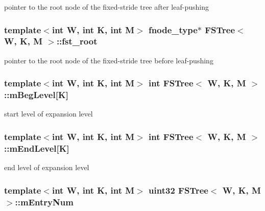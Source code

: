 pointer to the root node of the fixed-\/stride tree after leaf-\/pushing 

\hypertarget{classFSTree_ae2f006ad7037ccce518c2e21cebde7f1}{
\subsubsection[{fst\-\_\-root}]{\setlength{\rightskip}{0pt plus 5cm}template$<$int W, int K, int M$>$ {\bf fnode\-\_\-type}$\ast$ {\bf F\-S\-Tree}$<$ {\bf W}, K, M $>$\-::fst\-\_\-root\hspace{0.3cm}{\ttfamily [private]}}}\label{classFSTree_ae2f006ad7037ccce518c2e21cebde7f1}


pointer to the root node of the fixed-\/stride tree before leaf-\/pushing 

\hypertarget{classFSTree_afe2edb406c6e4b670a59e7c3d1edaa70}{
\subsubsection[{m\-Beg\-Level}]{\setlength{\rightskip}{0pt plus 5cm}template$<$int W, int K, int M$>$ int {\bf F\-S\-Tree}$<$ {\bf W}, K, M $>$\-::m\-Beg\-Level\mbox{[}K\mbox{]}\hspace{0.3cm}{\ttfamily [private]}}}\label{classFSTree_afe2edb406c6e4b670a59e7c3d1edaa70}


start level of expansion level 

\hypertarget{classFSTree_a6e0ee4d265489224ed08378a5f2e3b1f}{
\subsubsection[{m\-End\-Level}]{\setlength{\rightskip}{0pt plus 5cm}template$<$int W, int K, int M$>$ int {\bf F\-S\-Tree}$<$ {\bf W}, K, M $>$\-::m\-End\-Level\mbox{[}K\mbox{]}\hspace{0.3cm}{\ttfamily [private]}}}\label{classFSTree_a6e0ee4d265489224ed08378a5f2e3b1f}


end level of expansion level 

\hypertarget{classFSTree_a8c62509827ce3ebeb3f717baedd43089}{
\subsubsection[{m\-Entry\-Num}]{\setlength{\rightskip}{0pt plus 5cm}template$<$int W, int K, int M$>$ {\bf uint32} {\bf F\-S\-Tree}$<$ {\bf W}, K, M $>$\-::m\-Entry\-Num\hspace{0.3cm}{\ttfamily [private]}}}\label{classFSTree_a8c62509827ce3ebeb3f717baedd43089}


